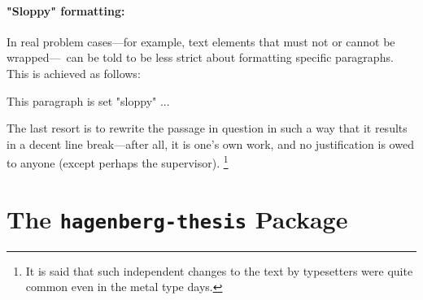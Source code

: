 \paragraph{"Sloppy" formatting:} In real problem cases---for example, text
elements that must not or cannot be wrapped---\latex\ can be told to be less
strict about formatting specific paragraphs. This is achieved as follows:
%
\begin{LaTeXCode}[numbers=none]
\begin{sloppypar}
    This paragraph is set "sloppy" ...
\end{sloppypar}
\end{LaTeXCode}
%
The last resort is to rewrite the passage in question in such a way that it
results in a decent line break---after all, it is one's own work, and no
justification is owed to anyone (except perhaps the supervisor).%
\footnote{It is said that such independent changes to the text by typesetters were
quite common even in the metal type days.}



\section{The \texttt{hagenberg-thesis} Package}

